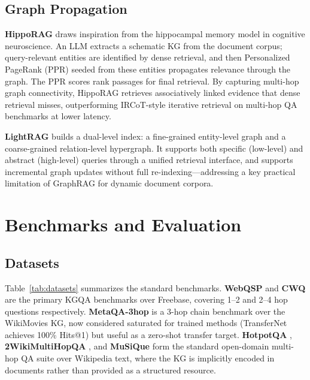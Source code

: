 \documentclass[11pt]{article}
\begin{document}
\subsection{Graph Propagation}
\label{sec:propagation}

\textbf{HippoRAG} \cite{gutierrez2024hipporag} draws inspiration from the hippocampal memory model in cognitive neuroscience. An LLM extracts a schematic KG from the document corpus; query-relevant entities are identified by dense retrieval, and then Personalized PageRank (PPR) seeded from these entities propagates relevance through the graph. The PPR scores rank passages for final retrieval. By capturing multi-hop graph connectivity, HippoRAG retrieves associatively linked evidence that dense retrieval misses, outperforming IRCoT-style iterative retrieval \cite{trivedi2023ircot} on multi-hop QA benchmarks at lower latency.

\textbf{LightRAG} \cite{guo2024lightrag} builds a dual-level index: a fine-grained entity-level graph and a coarse-grained relation-level hypergraph. It supports both specific (low-level) and abstract (high-level) queries through a unified retrieval interface, and supports incremental graph updates without full re-indexing—addressing a key practical limitation of GraphRAG for dynamic document corpora.

\section{Benchmarks and Evaluation}
\label{sec:benchmarks}

\subsection{Datasets}

Table~\ref{tab:datasets} summarizes the standard benchmarks. \textbf{WebQSP} \cite{yih2016webqsp} and \textbf{CWQ} \cite{talmor2018cwq} are the primary KGQA benchmarks over Freebase, covering 1--2 and 2--4 hop questions respectively. \textbf{MetaQA-3hop} \cite{zhang2018metaqa} is a 3-hop chain benchmark over the WikiMovies KG, now considered saturated for trained methods (TransferNet achieves 100\% Hits@1) but useful as a zero-shot transfer target. \textbf{HotpotQA} \cite{yang2018hotpotqa}, \textbf{2WikiMultiHopQA} \cite{ho2020wikimultihop}, and \textbf{MuSiQue} \cite{trivedi2022musique} form the standard open-domain multi-hop QA suite over Wikipedia text, where the KG is implicitly encoded in documents rather than provided as a structured resource.
\end{document}
